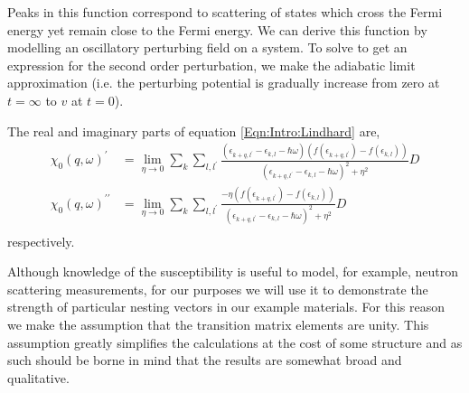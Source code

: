 Peaks in this function correspond to scattering of states which cross the Fermi energy yet remain close to the Fermi energy.  We can derive this function by modelling an oscillatory perturbing field on a system. To solve to get an expression for the second order perturbation, we make the adiabatic limit approximation (i.e. the perturbing potential is gradually increase from zero at $t=\infty$ to $v$ at $t=0$).

The real and imaginary parts of equation \ref{Eqn:Intro:Lindhard} are,
\begin{align}
\chi_0(q, \omega)^\prime &= \lim_{\eta \to 0} \sum_{k}\sum_{l, l^\prime}\frac{(\epsilon_{k+q,l^\prime} - \epsilon_{k,l} - \hbar\omega) (f(\epsilon_{k+q,l^\prime}) - f(\epsilon_{k,l}))}{(\epsilon_{k+q,l^\prime} - \epsilon_{k,l} - \hbar\omega)^2 + \eta^2}D \\
\chi_0(q, \omega)^{\prime\prime} &= \lim_{\eta \to 0} \sum_{k}\sum_{l, l^\prime}\frac{-\eta (f(\epsilon_{k+q,l^\prime}) - f(\epsilon_{k,l}))}{(\epsilon_{k+q,l^\prime} - \epsilon_{k,l} - \hbar\omega)^2 + \eta^2}D\\
\end{align}
respectively.

Although knowledge of the susceptibility is useful to model, for example, neutron scattering measurements, for our purposes we will use it to demonstrate the strength of particular nesting vectors in our example materials. For this reason we make the assumption that the transition matrix elements are unity. This assumption greatly simplifies the calculations at the cost of some structure and as such should be borne in mind that the results are somewhat broad and qualitative.






